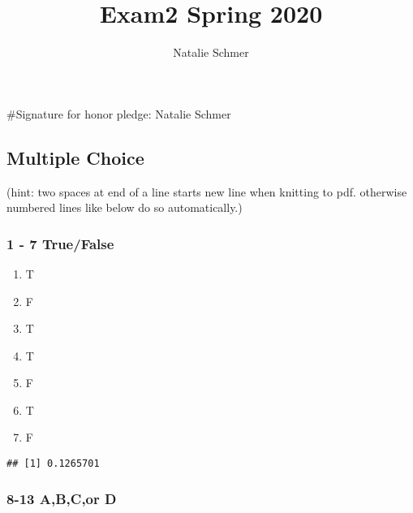 \documentclass[]{article}
\title{Exam2 Spring 2020}
\author{Natalie Schmer}
\date{}
\newenvironment{Shaded}{\begin{snugshade}}{\end{snugshade}}
\newcommand{\CommentTok}[1]{\textcolor[rgb]{0.56,0.35,0.01}{\textit{#1}}}
\newcommand{\DecValTok}[1]{\textcolor[rgb]{0.00,0.00,0.81}{#1}}
\newcommand{\FloatTok}[1]{\textcolor[rgb]{0.00,0.00,0.81}{#1}}
\newcommand{\KeywordTok}[1]{\textcolor[rgb]{0.13,0.29,0.53}{\textbf{#1}}}
\newcommand{\NormalTok}[1]{#1}
\newcommand{\OperatorTok}[1]{\textcolor[rgb]{0.81,0.36,0.00}{\textbf{#1}}}
\newcommand{\StringTok}[1]{\textcolor[rgb]{0.31,0.60,0.02}{#1}}
\providecommand{\tightlist}{%
  \setlength{\itemsep}{0pt}\setlength{\parskip}{0pt}}
\begin{document}
\maketitle

\#Signature for honor pledge: Natalie Schmer

\hypertarget{multiple-choice}{%
\subsection{Multiple Choice}\label{multiple-choice}}

(hint: two spaces at end of a line starts new line when knitting to pdf.
otherwise numbered lines like below do so automatically.)

\hypertarget{truefalse}{%
\subsubsection{1 - 7 True/False}\label{truefalse}}

\begin{enumerate}
\def\labelenumi{\arabic{enumi}.}
\tightlist
\item
  T
\item
  F
\item
  T
\item
  T
\item
  F
\item
  T
\item
  F
\end{enumerate}

\begin{Shaded}
\end{Shaded}

\begin{verbatim}
## [1] 0.1265701
\end{verbatim}

\hypertarget{abcor-d}{%
\subsubsection{8-13 A,B,C,or D}\label{abcor-d}}
\end{document}
